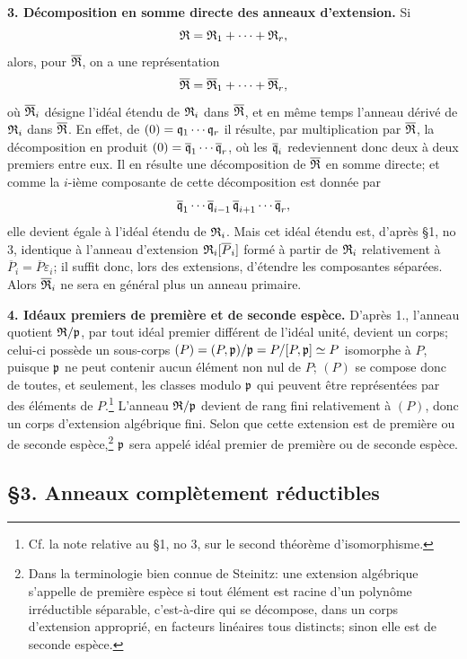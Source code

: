 \textbf{3. Décomposition en somme directe des anneaux d'extension.} Si
\[
   \mathfrak R=\mathfrak R_1+\cdots+\mathfrak R_r,
\]
alors, pour $\overline{\mathfrak R}$, on a une représentation
\[
   \overline{\mathfrak R}=\overline{\mathfrak R}_1+\cdots+\overline{\mathfrak R}_r,
\]
où $\overline{\mathfrak R}_i$ désigne l'idéal étendu de $\mathfrak R_i$ dans $\overline{\mathfrak R}$, et en même temps l'anneau dérivé de $\mathfrak R_i$ dans $\overline{\mathfrak R}$. En effet, de $(0)=\mathfrak q_1\cdots\mathfrak q_r$ il résulte, par multiplication par $\overline{\mathfrak R}$, la décomposition en produit $(0)=\overline{\mathfrak q}_1\cdots\overline{\mathfrak q}_r$, où les $\overline{\mathfrak q}_i$ redeviennent donc deux à deux premiers entre eux. Il en résulte une décomposition de $\overline{\mathfrak R}$ en somme directe; et comme la $i$-ième composante de cette décomposition est donnée par
\[
   \overline{\mathfrak q}_1\cdots\overline{\mathfrak q}_{i-1}\,
   \overline{\mathfrak q}_{i+1}\cdots\overline{\mathfrak q}_r,
\]
elle devient égale à l'idéal étendu de $\mathfrak R_i$. Mais cet idéal étendu est, d'après \S 1, no 3, identique à l'anneau d'extension $\mathfrak R_i[\overline P_i]$ formé à partir de $\mathfrak R_i$ relativement à $\overline P_i=\overline P\varepsilon_i$; il suffit donc, lors des extensions, d'étendre les composantes séparées. Alors $\overline{\mathfrak R}_i$ ne sera en général plus un anneau primaire.

\textbf{4. Idéaux premiers de première et de seconde espèce.} D'après 1., l'anneau quotient $\mathfrak R/\mathfrak p$, par tout idéal premier différent de l'idéal unité, devient un corps; celui-ci possède un sous-corps $(P)=(P,\mathfrak p)/\mathfrak p=P/[P,\mathfrak p]\simeq P$ isomorphe à $P$, puisque $\mathfrak p$ ne peut contenir aucun élément non nul de $P$; $(P)$ se compose donc de toutes, et seulement, les classes modulo $\mathfrak p$ qui peuvent être représentées par des éléments de $P$.\footnote{Cf. la note relative au \S 1, no 3, sur le second théorème d'isomorphisme.} L'anneau $\mathfrak R/\mathfrak p$ devient de rang fini relativement à $(P)$, donc un corps d'extension algébrique fini. Selon que cette extension est de première ou de seconde espèce,\footnote{Dans la terminologie bien connue de Steinitz: une extension algébrique s'appelle de première espèce si tout élément est racine d'un polynôme irréductible séparable, c'est-à-dire qui se décompose, dans un corps d'extension approprié, en facteurs linéaires tous distincts; sinon elle est de seconde espèce.} $\mathfrak p$ sera appelé idéal premier de première ou de seconde espèce.

\subsection*{\S 3. Anneaux complètement réductibles}

